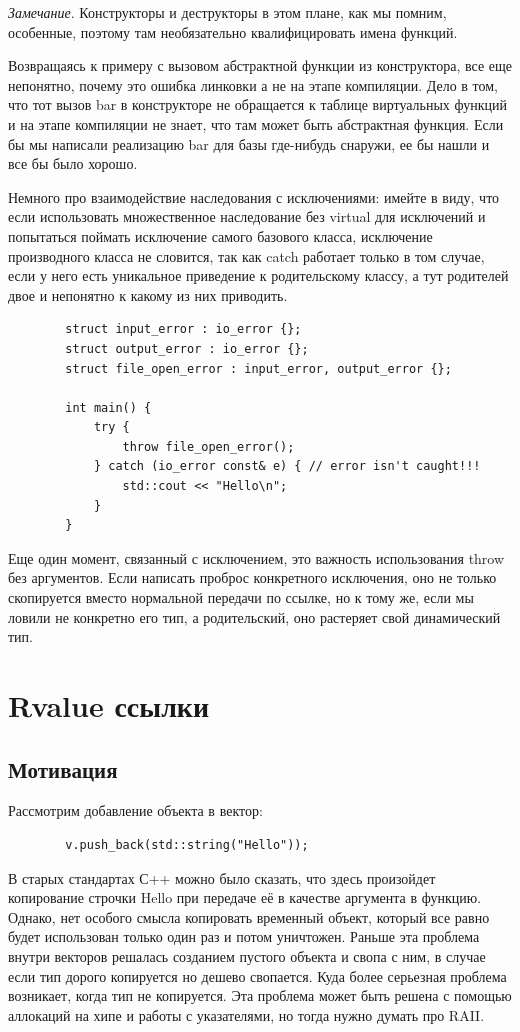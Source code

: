 \documentclass[12pt, a4paper]{article}
\begin{document}
	\textit{Замечание}. Конструкторы и деструкторы в этом плане, как мы помним, особенные, поэтому там необязательно квалифицировать имена функций.
	\par Возвращаясь к примеру с вызовом абстрактной функции из конструктора, все еще непонятно, почему это ошибка линковки а не на этапе компиляции. Дело в том, что тот вызов bar в конструкторе не обращается к таблице виртуальных функций и на этапе компиляции не знает, что там может быть абстрактная функция. Если бы мы написали реализацию bar для базы где-нибудь снаружи, ее бы нашли и все бы было хорошо.
	\\\par Немного про взаимодействие наследования с исключениями: имейте в виду, что если использовать множественное наследование без virtual для исключений и попытаться поймать исключение самого базового класса, исключение производного класса не словится, так как catch работает только в том случае, если у него есть уникальное приведение к родительскому классу, а тут родителей двое и непонятно к какому из них приводить.
	\begin{verbatim}
		struct input_error : io_error {};
		struct output_error : io_error {};
		struct file_open_error : input_error, output_error {};
		
		int main() {
			try {
				throw file_open_error();
			} catch (io_error const& e) { // error isn't caught!!!
				std::cout << "Hello\n";
			} 
		}
	\end{verbatim}
	Еще один момент, связанный с исключением, это важность использования throw без аргументов. Если написать проброс конкретного исключения, оно не только скопируется вместо нормальной передачи по ссылке, но к тому же, если мы ловили не конкретно его тип, а родительский, оно растеряет свой динамический тип.
	\section{Rvalue ссылки}
	\subsection{Мотивация}
	Рассмотрим добавление объекта в вектор:
	\begin{verbatim}
		v.push_back(std::string("Hello"));
	\end{verbatim}
	В старых стандартах С++ можно было сказать, что здесь произойдет копирование строчки Hello при передаче её в качестве аргумента в функцию. Однако, нет особого смысла копировать временный объект, который все равно будет использован только один раз и потом уничтожен. Раньше эта проблема внутри векторов решалась созданием пустого объекта и свопа с ним, в случае если тип дорого копируется но дешево свопается. Куда более серьезная проблема возникает, когда тип не копируется. Эта проблема может быть решена с помощью аллокаций на хипе и работы с указателями, но тогда нужно думать про RAII.
\end{document}
